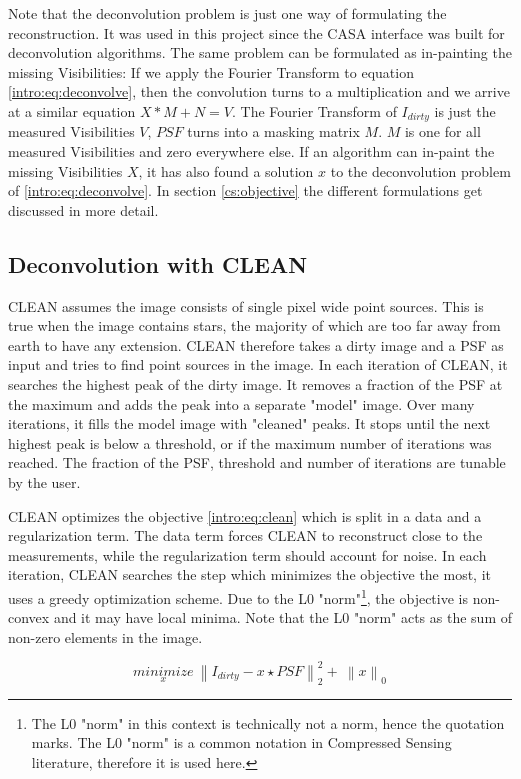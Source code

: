 Note that the deconvolution problem is just one way of formulating the reconstruction. It was used in this project since the CASA interface was built for deconvolution algorithms. The same problem can be formulated as in-painting the missing Visibilities: If we apply the Fourier Transform to equation \eqref{intro:eq:deconvolve}, then the convolution turns to a multiplication and we arrive at a similar equation $X*M + N = V$. The Fourier Transform of $I_{dirty}$ is just the measured Visibilities $V$,  $PSF$ turns into a masking matrix $M$. $M$ is one for all measured Visibilities and zero everywhere else. If an algorithm can in-paint the missing Visibilities $X$, it has also found a solution $x$ to the deconvolution problem of \eqref{intro:eq:deconvolve}. In section \ref{cs:objective} the different formulations get discussed in more detail.


\subsection{Deconvolution with CLEAN}
CLEAN assumes the image consists of single pixel wide point sources. This is true when the image contains stars, the majority of which are too far away from earth to have any extension. CLEAN therefore takes a dirty image and a PSF as input and tries to find point sources in the image. In each iteration of CLEAN, it searches the highest peak of the dirty image. It removes a fraction of the PSF at the maximum and adds the peak into a separate "model" image. Over many iterations, it fills the model image with "cleaned" peaks. It stops until the next highest peak is below a threshold, or if the maximum number of iterations was reached. The fraction of the PSF, threshold and number of iterations are tunable by the user. 

CLEAN optimizes the objective \eqref{intro:eq:clean} which is split in a data and a regularization term. The data term forces CLEAN to reconstruct close to the measurements, while the regularization term should account for noise. In each iteration, CLEAN searches the step which minimizes the objective the most, it uses a greedy optimization scheme. Due to the L0 "norm"\footnote{The L0 "norm" in this context is technically not a norm, hence the quotation marks. The L0 "norm" is a common notation in Compressed Sensing literature, therefore it is used here.}, the objective is non-convex and it may have local minima. Note that the L0 "norm" acts as the sum of non-zero elements in the image.

\begin{equation}\label{intro:eq:clean}
\underset{x}{minimize} \: \left \| I_{dirty} - x \star PSF \right \|_2^2 + \: \left \| x \right \|_0
\end{equation}

